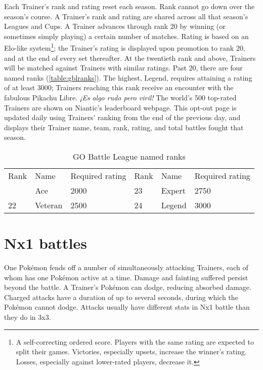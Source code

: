 Each Trainer's rank and rating reset each season.
Rank cannot go down over the season's course.
A Trainer's rank and rating are shared across all that season's Leagues and Cups.
A Trainer advances through rank 20 by winning (or sometimes simply playing) a certain number of matches.
Rating is based on an Elo-like system\footnote{A self-correcting ordered score.
Players with the same rating are expected to split their games.
Victories, especially upsets, increase the winner's rating.
Losses, especially against lower-rated players, decrease it.}; the Trainer's rating is displayed upon promotion to rank 20, and at the end of every set thereafter.
At the twentieth rank and above, Trainers will be matched against Trainers with similar ratings.
Past 20, there are four named ranks (\autoref{table:gblranks}).
The highest, Legend, requires attaining a rating of at least 3000;
 Trainers reaching this rank receive an encounter with the
 fabulous Pikachu Libre. \textit{¡Es algo rudo pero viril!}
The world's 500 top-rated Trainers are shown on Niantic's leaderboard webpage.
This opt-out page is updated daily using Trainers' ranking from the end of the previous day,
 and displays their Trainer name, team, rank, rating, and total battles fought that season.
\begin{table}
\centering
\begin{tabular}{lll|lll}
Rank & Name & Required rating & Rank & Name & Required rating\\
\Midrule
21 & Ace & 2000     & 23 & Expert & 2750\\
22 & Veteran & 2500 & 24 & Legend & 3000\\
\end{tabular}
\caption{GO Battle League named ranks\label{table:gblranks}}
\end{table}

\section{Nx1 battles\label{sec:nx1}}
One Pokémon fends off a number of simultaneously attacking Trainers, each of whom has one Pokémon active at a time.
Damage and fainting suffered persist beyond the battle.
A Trainer's Pokémon can dodge, reducing absorbed damage.
Charged attacks have a duration of up to several seconds, during which the Pokémon cannot dodge.
Attacks usually have different stats in Nx1 battle than they do in 3x3.


